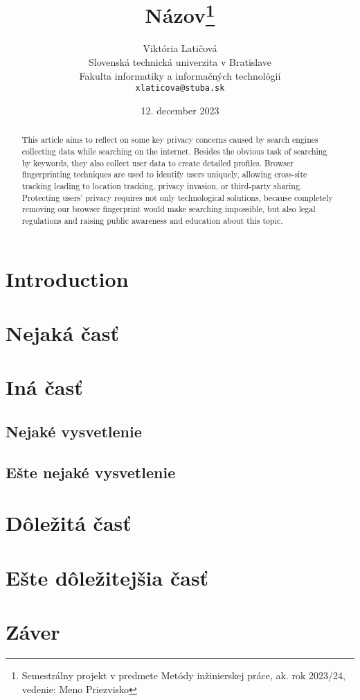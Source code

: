 \documentclass[10pt,a4paper,]{article}
\title{Názov\thanks{Semestrálny projekt v predmete Metódy inžinierskej práce, ak. rok 2023/24, vedenie: Meno Priezvisko}} %
\author{Viktória Latičová\\[2pt]
	{\small Slovenská technická univerzita v Bratislave}\\
	{\small Fakulta informatiky a informačných technológií}\\
	{\small \texttt{xlaticova@stuba.sk}}
	}
\date{\small 12. december 2023} %
\begin{document}
\maketitle

\begin{abstract}
This article aims to reflect on some key privacy concerns caused by search engines collecting data while
searching on the internet. Besides the obvious task of searching by keywords, they also collect user data
to create detailed profiles. Browser fingerprinting techniques are used to identify users uniquely,
allowing cross-site tracking leading to location tracking, privacy invasion, or third-party sharing.
Protecting users' privacy requires not only technological solutions, because completely removing our
browser fingerprint would make searching impossible, but also legal regulations and raising public
awareness and education about this topic.
\end{abstract}


\section{Introduction}
\section{Nejaká časť} 
\section{Iná časť} 
\subsection{Nejaké vysvetlenie}
\subsection{Ešte nejaké vysvetlenie}
\section{Dôležitá časť} 
\section{Ešte dôležitejšia časť} 
\section{Záver} 





\end{document}
